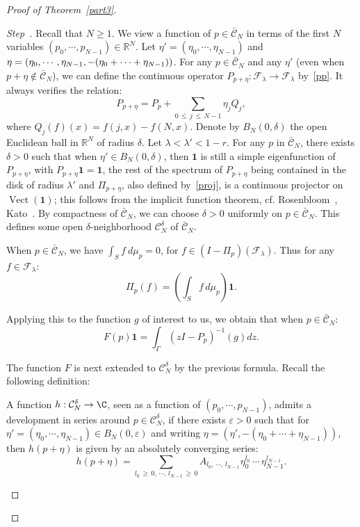 \documentclass[AHL,Unicode,longabstracts,published]{cedram}
\newcommand{\Rbb}{\mathbb R}
\newcommand{\Ccl}{\mathcal{C}}
\newcommand{\Fcl}{\mathcal{F}}
\newcommand{\bfun}{\mathbf{1}}
\DeclareMathOperator{\Vect}{Vect}
\newcounter{stepcount}
\newenvironment{step}{\refstepcounter{stepcount}\begin{proof}[Step~\thestepcount]}{\let\qed\relax\end{proof}}
\begin{document}
\begin{proof}[{Proof of Theorem~\ref{part3}}]
\begin{step}
Recall that $N\geq1$. We view a function of $p\in \bar{\Ccl}_N$ in terms of the first $N$ variables $(p_0,\cdots,p_{N-1})\in\Rbb^N$. Let $\eta'=(\eta_0,\cdots,\eta_{N-1})$ and $\eta=(\eta_0,\cdots,\eta_{N-1},-(\eta_0+\cdots\linebreak+\eta_{N-1}))$. For any $p\in\bar{\Ccl}_N$ and any $\eta'$ (even when $p+\eta\not\in\bar{\Ccl}_N$), we can define the continuous operator $P_{p+\eta} : {\Fcl}_{\lambda}\rightarrow{\Fcl}_{\lambda}$ by~\eqref{pp}. It always verifies the relation:
\[
P_{p+\eta}=P_p+\sum_{0\,\leq\,j\,\leq\,N-1}\eta_jQ_j,
\]
where $Q_j(f)(x)=f(j,x)-f(N,x)$. Denote by $B_N(0,\delta)$ the open Euclidean ball in $\Rbb^N$ of radius $\delta$. Let $\lambda<\lambda'<1-r$. For any $p$ in $\bar{\Ccl}_N$, there exists $\delta>0$ such that when $\eta'\in B_N(0,\delta)$, then $\bfun$ is still a simple eigenfunction of $P_{p+\eta}$, with $P_{p+\eta}\bfun=\bfun$, the rest of the spectrum of $P_{p+\eta}$ being contained in the disk of radius $\lambda'$ and $\Pi_{p+\eta}$, also defined by~\eqref{proj}, is a continuous projector on $\Vect(\bfun)$; this follows from the implicit function theorem, cf. Rosenbloom~\cite{rosen}, Kato~\cite{kato}. By compactness of $\bar{\Ccl}_N$, we can choose $\delta>0$ uniformly on $p\in\bar{\Ccl}_N$. This defines some open $\delta$-neighborhood ${\Ccl}^{\delta}_N$ of $\bar{\Ccl}_N$.



When $p\in\bar{\Ccl}_N$, we have $\int_Sf~d\mu_p=0$, for $f\in(I-\Pi_p)({\Fcl}_{\lambda})$. Thus for any $f\in{\Fcl}_{\lambda}$:
\[
\Pi_p(f)=\left({\int_Sf\,d\mu_p}\right)\bfun.
\]



Applying this to the function $g$ of interest to us, we obtain that when $p\in\bar{\Ccl}_N$:
\[
F(p)\bfun=\int_{\Gamma}\left(zI-P_p\right)^{-1}(g)dz.
\]


The function $F$ is next extended to ${\Ccl}^{\delta}_N$ by the previous formula. Recall the following definition:


\begin{defi}
A function $h:{\Ccl}^{\delta}_N\rightarrow\C$, seen as a function of $(p_0,\cdots,p_{N-1})$, admits a development in series around $p\in{\Ccl}^{\delta}_N$, if there exists $\varepsilon>0$ such that for $\eta'=(\eta_0,\cdots,\eta_{N-1})\in B_N(0,\varepsilon)$ and writing $\eta=(\eta',-(\eta_0+\cdots+\eta_{N-1}))$, then $h(p+\eta)$ is given by an absolutely converging series:
\[
h(p+\eta)=\sum_{l_0\,\geq\,0,\,\cdots,\,l_{N-1}\,\geq\,0}A_{l_0,\,\cdots,\,l_{N-1}}\eta_0^{l_0}\,\cdots\,\eta_{N-1}^{l_{N-1}}.
\]


\end{defi}
\end{step}
\end{proof}
\end{document}
